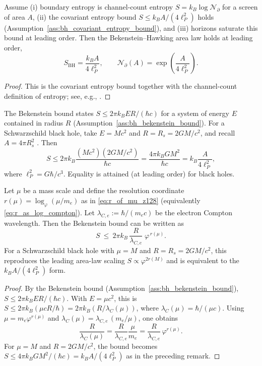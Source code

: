 \begin{proposition}
Assume (i) boundary entropy is channel-count entropy $S=k_B\log\mathcal{N}_\partial$ for a screen of area $A$, (ii) the covariant entropy bound $S\le k_BA/(4\ell_P^2)$ holds (Assumption~\ref{ass:bh_covariant_entropy_bound}), and (iii) horizons saturate this bound at leading order.
Then the Bekenstein--Hawking area law holds at leading order,
\[
S_{\mathrm{BH}}=\frac{k_BA}{4\ell_P^2},
\qquad
\mathcal{N}_\partial(A)=\exp\!\left(\frac{A}{4\ell_P^2}\right).
\]
\end{proposition}
\begin{proof}
This is the covariant entropy bound together with the channel-count definition of entropy; see, e.g., \cite{Bousso2002}.
\end{proof}

\begin{remark}
The Bekenstein bound states $S\le 2\pi k_B ER/(\hbar c)$ for a system of energy $E$ contained in radius $R$ \cite{Bekenstein1981} (Assumption~\ref{ass:bh_bekenstein_bound}).
For a Schwarzschild black hole, take $E=Mc^2$ and $R=R_s=2GM/c^2$, and recall $A=4\pi R_s^2$ \cite{Wald1984}. Then
\[
S\le 2\pi k_B\frac{(Mc^2)(2GM/c^2)}{\hbar c}= \frac{4\pi k_B GM^2}{\hbar c}
=k_B\frac{A}{4\ell_P^2},
\]
where $\ell_P^2=G\hbar/c^3$. Equality is attained (at leading order) for black holes.
\end{remark}

\begin{proposition}
\label{prop:bekenstein_bound_r_coordinate}
Let $\mu$ be a mass scale and define the resolution coordinate $r(\mu)=\log_\varphi(\mu/m_e)$ as in \eqref{eq:r_of_mu_z128} (equivalently \eqref{eq:r_as_log_compton}).
Let $\lambda_{C,e}:=\hbar/(m_ec)$ be the electron Compton wavelength.
Then the Bekenstein bound can be written as
\[
S\ \le\ 2\pi k_B\,\frac{R}{\lambda_{C,e}}\;\varphi^{\,r(\mu)}.
\]
For a Schwarzschild black hole with $\mu=M$ and $R=R_s=2GM/c^2$, this reproduces the leading area-law scaling $S\propto \varphi^{2r(M)}$ and is equivalent to the $k_BA/(4\ell_P^2)$ form.
\end{proposition}
\begin{proof}
By the Bekenstein bound \cite{Bekenstein1981} (Assumption~\ref{ass:bh_bekenstein_bound}), $S\le 2\pi k_B ER/(\hbar c)$.
With $E=\mu c^2$, this is $S\le 2\pi k_B (\mu cR/\hbar)=2\pi k_B (R/\lambda_{C}(\mu))$, where $\lambda_C(\mu)=\hbar/(\mu c)$.
Using $\mu=m_e\varphi^{r(\mu)}$ and $\lambda_C(\mu)=\lambda_{C,e}\,(m_e/\mu)$, one obtains
\[
\frac{R}{\lambda_C(\mu)}=\frac{R}{\lambda_{C,e}}\frac{\mu}{m_e}=\frac{R}{\lambda_{C,e}}\,\varphi^{r(\mu)}.
\]
For $\mu=M$ and $R=2GM/c^2$, the bound becomes $S\le 4\pi k_B GM^2/(\hbar c)=k_BA/(4\ell_P^2)$ as in the preceding remark.
\end{proof}

